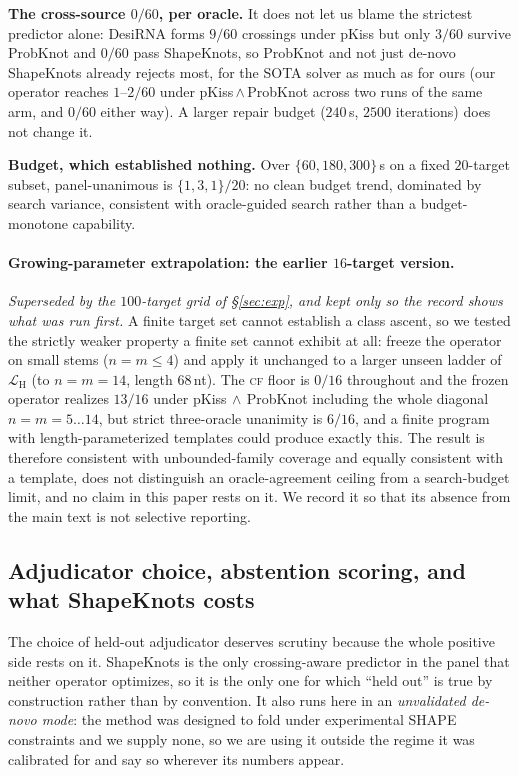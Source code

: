 \documentclass[11pt]{article}
\newcommand{\CF}{\textsc{cf}}
\begin{document}
\smallskip\noindent\textbf{The cross-source $0/60$, per oracle.} It does not let us blame the strictest
predictor alone: DesiRNA forms $9/60$ crossings under pKiss but only $3/60$ survive ProbKnot and $0/60$ pass
ShapeKnots, so ProbKnot and not just de-novo ShapeKnots already rejects most, for the SOTA solver as much as for
ours (our operator reaches $1$--$2/60$ under pKiss\,$\wedge$\,ProbKnot across two runs of the same arm, and
$0/60$ either way). A larger repair budget ($240$\,s, $2500$ iterations) does not change it.

\smallskip\noindent\textbf{Budget, which established nothing.} Over $\{60,180,300\}$\,s on a fixed $20$-target
subset, panel-unanimous is $\{1,3,1\}/20$: no clean budget trend, dominated by search variance, consistent with
oracle-guided search rather than a budget-monotone capability.

\paragraph{Growing-parameter extrapolation: the earlier $16$-target version.} \emph{Superseded by the
$100$-target grid of \S\ref{sec:exp}, and kept only so the record shows what was run first.} A finite target set cannot
establish a class ascent, so we tested the strictly weaker property a finite set cannot exhibit at all:
freeze the operator on small stems ($n{=}m\le4$) and apply it unchanged to a larger unseen ladder of
$\mathcal L_{\mathrm H}$ (to $n{=}m{=}14$, length $68$\,nt). The \CF{} floor is $0/16$ throughout and the
frozen operator realizes $13/16$ under pKiss$\,\wedge\,$ProbKnot including the whole diagonal
$n{=}m{=}5\ldots14$, but strict three-oracle unanimity is $6/16$, and a finite program with
length-parameterized templates could produce exactly this. The result is therefore consistent with
unbounded-family coverage and equally consistent with a template, does not distinguish an oracle-agreement
ceiling from a search-budget limit, and no claim in this paper rests on it. We record it so that its absence
from the main text is not selective reporting.

\subsection{Adjudicator choice, abstention scoring, and what ShapeKnots costs}\label{app:adjud}
The choice of held-out adjudicator deserves scrutiny because the whole positive side rests on it. ShapeKnots is
the only crossing-aware predictor in the panel that neither operator optimizes, so it is the only one for which
``held out'' is true by construction rather than by convention. It also runs here in an \emph{unvalidated
de-novo mode}: the method was designed to fold under experimental SHAPE constraints
\citep{hajdin2013shapeknots} and we supply none, so we are using it outside the regime it was calibrated for
and say so wherever its numbers appear.
\end{document}
